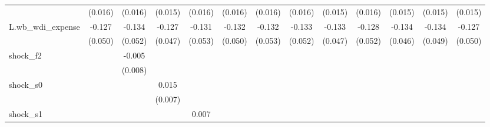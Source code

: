 {\begin{tabular}{l*{12}{c}}
            &     (0.016)         &     (0.016)         &     (0.015)         &     (0.016)         &     (0.016)         &     (0.016)         &     (0.016)         &     (0.015)         &     (0.016)         &     (0.015)         &     (0.015)         &     (0.015)         \\
\addlinespace
L.wb\_wdi\_expense&      -0.127\sym{**} &      -0.134\sym{**} &      -0.127\sym{**} &      -0.131\sym{**} &      -0.132\sym{**} &      -0.132\sym{**} &      -0.133\sym{**} &      -0.133\sym{***}&      -0.128\sym{**} &      -0.134\sym{***}&      -0.134\sym{**} &      -0.127\sym{**} \\
            &     (0.050)         &     (0.052)         &     (0.047)         &     (0.053)         &     (0.050)         &     (0.053)         &     (0.052)         &     (0.047)         &     (0.052)         &     (0.046)         &     (0.049)         &     (0.050)         \\
\addlinespace
shock\_f2    &                     &      -0.005         &                     &                     &                     &                     &                     &                     &                     &                     &                     &                     \\
            &                     &     (0.008)         &                     &                     &                     &                     &                     &                     &                     &                     &                     &                     \\
\addlinespace
shock\_s0    &                     &                     &       0.015\sym{**} &                     &                     &                     &                     &                     &                     &                     &                     &                     \\
            &                     &                     &     (0.007)         &                     &                     &                     &                     &                     &                     &                     &                     &                     \\
\addlinespace
shock\_s1    &                     &                     &                     &       0.007         &                     &                     &                     &                     &                     &                     &                     &                     \\

\end{tabular}}
